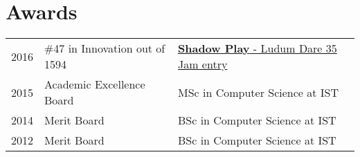 \documentclass[a4paper]{deedy-resume} %
\begin{document}
\begin{minipage}[t]{0.64\textwidth}
\sectionspace %

\begin{comment}
\section{Research}

\href{https://nunoxu.github.io/downloads/MSc_Trust_HAI.pdf}{\runsubsection{Trustful Action Suggestion\\ in Human Agent Interaction}}
\descript{| MSc Thesis}

\location{September 2015 - Nov 2016 (14 months) | IST - Lisbon, PT}
In order to increase \textbf{trustfulness} in \textbf{virtual agents}, this research aimed to create a module that will suggest actions to improve trust on the agent. To this end, a \textbf{cognitive trust model} was also being implemented.


\sectionspace %
\end{comment}

\begin{comment}

\section{Individual Work}

\runsubsection{Coderdojo@Técnico}
\descript{| Founder and Organizer}

\location{December 2014 - June 2015 (7 months) | IST - Lisbon, PT}
Was one of the founders of a \textbf{\href{https://coderdojo.com/}{Coderdojo}} branch in IST, which consisted in a monthly event meant to teach programming skills to children and teenagers.

\sectionspace %

\end{comment}


\section{Awards} 
\begin{tabular}{rll}
	2016	     & \#47 in Innovation out of 1594 & \href{http://ludumdare.com/compo/ludum-dare-35/?uid=90138}{\textbf{Shadow Play} - Ludum Dare 35 Jam entry}\\
    2015	     & Academic Excellence Board  & MSc in Computer Science at IST\\
	2014	     & Merit Board  & BSc in Computer Science at IST\\
	2012	     & Merit Board  & BSc in Computer Science at IST\\
\end{tabular}


\end{minipage}
\end{document}
